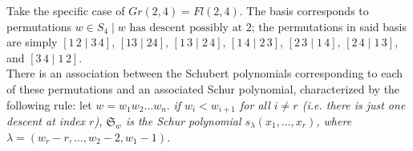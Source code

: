 Take the specific case of $Gr(2, 4) = Fl(2, 4)$. The basis corresponds to permutations 
$w \in S_4 \mid w \text{ has descent possibly at $2$}$; the permutations in said basis are simply $[1\, 2 \mid 3 \,4]$, $[1 3 \mid 2 4]$, $[1\, 3 \mid 2\,4]$, $[1\,4 \mid 2\,3]$, $[2\,3 \mid 1\,4]$, $[2\,4 \mid 1\,3]$, and $[3\,4 \mid 1\,2]$. \\

There is an association between the Schubert polynomials corresponding to each of these permutations and an associated Schur polynomial, characterized by the following rule: let $w = w_1 w_2 \dots w_n$. 
\textit{if $w_i < w_{i+1}$ for all $i \neq r$ (i.e. there is just one descent at index $r$), $\mathfrak{S}_w$ is the Schur polynomial $s_\lambda(x_1, \dots, x_r)$, where $\lambda = (w_r - r, \dots, w_2 - 2, w_1 - 1)$.}


